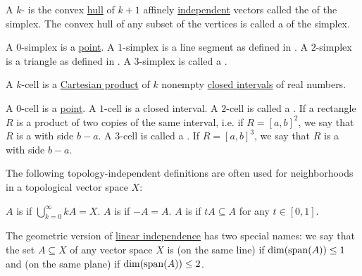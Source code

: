 \begin{definition}\label{def:simplex}
  A \( k \)- is the convex \hyperref[def:convex_set/hull]{hull} of \( k + 1 \) affinely \hyperref[affine_independence]{independent} vectors called the  of the simplex. The convex hull of any subset of the vertices is called a  of the simplex.

  \begin{defenum}
     A \( 0 \)-simplex is a \hyperref[def:point]{point}.
     A \( 1 \)-simplex is a line segment as defined in .
     A \( 2 \)-simplex is a triangle as defined in .
     A \( 3 \)-simplex is called a .
  \end{defenum}
\end{definition}

\begin{definition}\label{def:k_cell}
  A \( k \)-cell is a \hyperref[def:cartesian_product]{Cartesian product} of \( k \) nonempty \hyperref[def:total_order_interval/closed]{closed intervals} of real numbers.

  \begin{defenum}
     A \( 0 \)-cell is a \hyperref[def:point]{point}.
     A \( 1 \)-cell is a closed interval.
     A \( 2 \)-cell is called a . If a rectangle \( R \) is a product of two copies of the same interval, i.e. if \( R = [a, b]^2 \), we say that \( R \) is a  with side \( b - a \).
     A \( 3 \)-cell is called a . If \( R = [a, b]^3 \), we say that \( R \) is a  with side \( b - a \).
  \end{defenum}
\end{definition}

\begin{definition}\label{def:neighborhood_set_types}
  The following topology-independent definitions are often used for neighborhoods in a topological vector space \( X \):

  \begin{defenum}
     \( A \) is  if \( \bigcup_{k=0}^\infty kA = X \).
     \( A \) is  if \( -A = A \).
     \( A \) is  if \( tA \subseteq A \) for any \( t \in [0, 1] \).
  \end{defenum}
\end{definition}

\begin{definition}\label{def:collinear_complanar}
  The geometric version of \hyperref[def:left_module_linear_dependence]{linear independence} has two special names: we say that the set \( A \subseteq X \) of any vector space \( X \) is  (on the same line) if \( \dim(\operatorname{span}(A)) \leq 1 \) and  (on the same plane) if \( \dim(\operatorname{span}(A)) \leq 2 \).
\end{definition}
